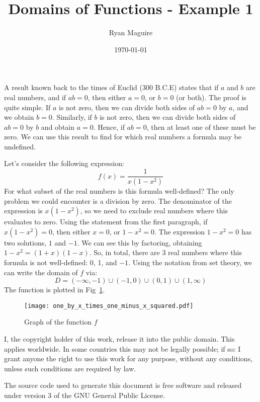 \documentclass{article}
\title{Domains of Functions - Example 1}
\author{Ryan Maguire}
\date{\today}
\begin{document}
    \maketitle
    A result known back to the times of Euclid (300 B.C.E) states that if
    $a$ and $b$ are real numbers, and if $ab=0$, then either $a=0$, or
    $b=0$ (or both). The proof is quite simple. If $a$ is not zero, then
    we can divide both sides of $ab=0$ by $a$, and we obtain $b=0$. Similarly,
    if $b$ is not zero, then we can divide both sides of $ab=0$ by $b$ and
    obtain $a=0$. Hence, if $ab=0$, then at least one of these must be zero.
    We can use this result to find for which real numbers a formula may be
    undefined.
    \par\hfill\par
    Let's consider the following expression:
    \begin{equation}
        f(x)=\frac{1}{x(1-x^{2})}
    \end{equation}
    For what subset of the real numbers is this formula well-defined? The only
    problem we could encounter is a division by zero. The denominator of the
    expression is $x(1-x^{2})$, so we need to exclude real numbers where this
    evaluates to zero. Using the statement from the first paragraph, if
    $x(1-x^{2})=0$, then either $x=0$, or $1-x^{2}=0$. The expression
    $1-x^{2}=0$ has two solutions, $1$ and $-1$. We can see this by factoring,
    obtaining $1-x^{2}=(1+x)(1-x)$. So, in total, there are 3 real numbers
    where this formula is not well-defined: 0, 1, and $-1$. Using the notation
    from set theory, we can write the domain of $f$ via:
    \begin{equation}
        D=(-\infty,-1)\cup(-1,0)\cup(0,1)\cup(1,\infty)
    \end{equation}
    The function is plotted in Fig~\ref{fig:graph_of_f}.
    \begin{figure}
        \centering
        \texttt{[image: one\_by\_x\_times\_one\_minus\_x\_squared.pdf]}
        \caption{Graph of the function $f$}
        \label{fig:graph_of_f}
    \end{figure}
    \newpage
    I, the copyright holder of this work, release it into the public domain.
    This applies worldwide. In some countries this may not be legally possible;
    if so: I grant anyone the right to use this work for any purpose, without
    any conditions, unless such conditions are required by law.
    \par\hfill\par
    The source code used to generate this document is free software and released
    under version 3 of the GNU General Public License.
\end{document}
